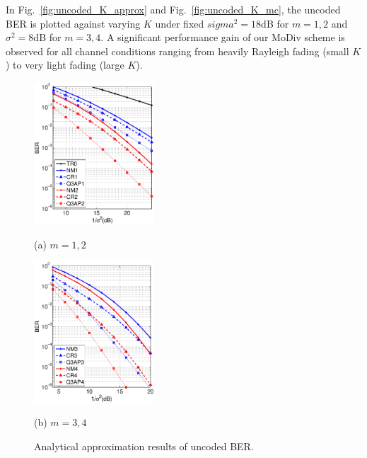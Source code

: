 \documentclass[journal,draftcls,onecolumn,12pt,twoside]{IEEEtran}
\begin{document}
In Fig.~\ref{fig:uncoded_K_approx} and Fig.~\ref{fig:uncoded_K_mc}, the uncoded
BER is plotted against varying $K$ under fixed $sigma^2 = 18$dB for $m=1,2$ and 
$\sigma^2 = 8$dB for $m=3,4$. A significant performance gain of our MoDiv scheme
is observed for all channel conditions ranging from heavily Rayleigh fading
(small $K$) to very light fading (large $K$).

\begin{figure}[!t]
  \begin{minipage}[b]{.48\linewidth}
    \centering
    \centerline{\includegraphics[width=4.5cm]{./figs/BER_noise_power_upperbound_64QAM_12.eps}}
    \centerline{(a) $m=1,2$}\medskip
  \end{minipage}
  \hfill
  \begin{minipage}[b]{0.48\linewidth}
    \centering
    \centerline{\includegraphics[width=4.5cm]{./figs/BER_noise_power_upperbound_64QAM_34.eps}}
    \centerline{(b) $m=3,4$}\medskip
  \end{minipage}
  \caption{Analytical approximation results of uncoded BER.}
  \label{fig:uncoded_noisepower_approx}
\end{figure}
\end{document}
